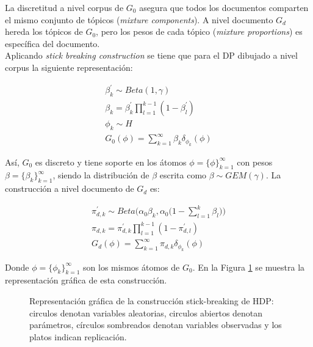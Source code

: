 \documentclass[letterpaper,12pt,oneside]{book} %
\begin{document}
La discretitud a nivel corpus de $G_{0}$ asegura que todos los documentos comparten el mismo conjunto de tópicos (\textit{mixture components}). A nivel documento $G_{d}$ hereda los tópicos de $G_{0}$, pero los pesos de cada tópico (\textit{mixture proportions}) es específica del documento.\\

Aplicando \textit{stick breaking construction} se tiene que para el DP dibujado a nivel corpus la siguiente representación:

\begin{align}
    \beta_{k}^{'} \sim Beta(1, \gamma) \\
    \beta_{k} = \beta_{k}^{'}\prod_{l=1}^{k-1}(1-\beta_{l}^{'})\\
    \phi_{k} \sim H  \\
    G_{0}(\phi)=\sum_{k=1}^{\infty}\beta_{k}\delta_{\phi_{k}}(\phi)
\end{align}


Así, $G_{0}$ es discreto y tiene soporte en los átomos $\phi = \{\phi\}_{k=1}^{\infty}$ con pesos $\beta=\{\beta_{k}\}_{k=1}^{\infty}$, siendo la distribución de $\beta$ escrita como $\beta \sim GEM(\gamma)$. La construcción a nivel documento de $G_{d}$ es:

\begin{align}
    \pi_{d,k}^{'}\sim Beta\big(\alpha_{0}\beta_{k}, \alpha_{0}\big(1-\sum_{l=1}^{k}\beta_{l}\big)\big)\\
    \pi_{d,k} = \pi_{d,k}^{'}\prod_{l=1}^{k-1}(1-\pi_{d,l}^{'})\\
    G_{d}(\phi)=\sum_{k=1}^{\infty}\pi_{d,k}\delta_{\phi_{k}}(\phi)
\end{align}

Donde $\phi = \{\phi_{k}\}_{k=1}^{\infty}$ son los mismos átomos de $G_{0}$. En la Figura \ref{img:hdp_sbc} se muestra la representación gráfica de esta construcción.

\begin{figure}
  \centering
\caption{Representación gráfica de la construcción stick-breaking de HDP: circulos denotan variables aleatorias, circulos abiertos denotan parámetros, círculos sombreados denotan variables observadas y los platos indican replicación.}
\label{img:hdp_sbc}
\end{figure}
\end{document}
